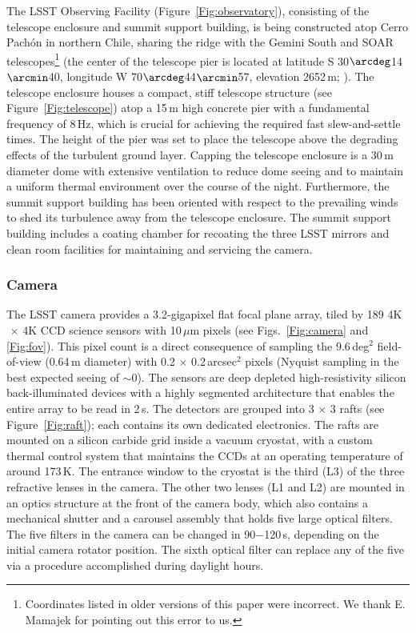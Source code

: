 The LSST Observing Facility (Figure~\ref{Fig:observatory}),
consisting of the telescope enclosure and summit support building, is being constructed atop Cerro Pach\'{o}n in northern Chile,
sharing the ridge with the Gemini South and SOAR telescopes\footnote{Coordinates listed in older versions
of this paper were incorrect. We thank E. Mamajek for pointing out this error to us.}
(the center of the telescope pier is located at latitude S 30$\arcdeg$14$\arcmin$40,
longitude W 70$\arcdeg$44$\arcmin$57, elevation 2652\,m;
\citealt{2012arXiv1210.1616M}).  The telescope enclosure houses a compact, stiff
telescope structure (see Figure~\ref{Fig:telescope}) atop a 15\,m high concrete pier
with a fundamental frequency of 8\,Hz, which is crucial for achieving the required fast slew-and-settle times.  The height of the pier was set to place the telescope above the degrading
effects of the turbulent ground layer.  Capping the telescope
enclosure is a 30\,m diameter dome with extensive ventilation to reduce
dome seeing
and to maintain a uniform thermal environment over the course of the night.  Furthermore, the summit support
building has been oriented with respect to the prevailing winds to shed its turbulence away from the
telescope enclosure.  The summit support building includes a coating chamber for recoating the three LSST mirrors and
clean room facilities for maintaining and servicing the camera.


\subsubsection{ Camera }


The LSST camera provides a 3.2-gigapixel flat focal plane array, tiled by 189
4K$\,\times\,$4K CCD science sensors with 10\,$\mu$m pixels (see Figs.~\ref{Fig:camera}
and \ref{Fig:fov}). This pixel count is a direct consequence of sampling the
9.6\,deg$^2$ field-of-view (0.64\,m diameter) with 0.2$\,\times\,$0.2\,arcsec$^2$
pixels (Nyquist sampling in the best expected seeing of $\sim$0).
The sensors are deep depleted high-resistivity silicon back-illuminated devices with
a highly segmented architecture that enables the entire array to be read in 2\,s.
The detectors are grouped into 3$\,\times\,$3 rafts (see Figure~\ref{Fig:raft}); each
contains its own dedicated electronics. The rafts are mounted on a silicon carbide
grid inside a vacuum cryostat, with a custom thermal control system that maintains
the CCDs at an operating temperature of around 173\,K. The entrance window to the
cryostat is the third (L3) of the three refractive lenses in the camera. The other
two lenses (L1 and L2) are mounted in an optics structure at the front of the camera
body, which also contains a mechanical shutter and a carousel assembly that holds
five large optical filters. The five filters in the camera can be changed in 90$-$120\,s,
depending on the initial camera rotator position. The sixth optical filter can
replace any of the five via a procedure accomplished during daylight hours.


